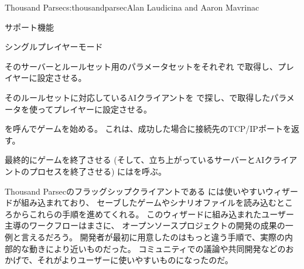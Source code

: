 \begin{aosachapter}{Thousand Parsec}{s:thousandparsec}{Alan Laudicina and Aaron Mavrinac}
\begin{aosasect1}{サポート機能}
\begin{aosasect2}{シングルプレイヤーモード}
\begin{aosaenumerate}
  \item そのサーバーとルールセット用のパラメータセットをそれぞれ
  で取得し、プレイヤーに設定させる。

  \item そのルールセットに対応しているAIクライアントを
  で探し、で取得したパラメータを使ってプレイヤーに設定させる。

  \item {}を呼んでゲームを始める。
  これは、成功した場合に接続先のTCP/IPポートを返す。

  \item 最終的にゲームを終了させる
  (そして、立ち上がっているサーバーとAIクライアントのプロセスを終了させる)
  にはを呼ぶ。

\end{aosaenumerate}

Thousand Parsecのフラッグシップクライアントである
には使いやすいウィザードが組み込まれており、
セーブしたゲームやシナリオファイルを読み込むところからこれらの手順を進めてくれる。
このウィザードに組み込まれたユーザー主導のワークフローはまさに、
オープンソースプロジェクトの開発の成果の一例と言えるだろう。
開発者が最初に用意したのはもっと違う手順で、実際の内部的な動きにより近いものだった。
コミュニティでの議論や共同開発などのおかげで、それがよりユーザーに使いやすいものになったのだ。


\end{aosasect2}
\end{aosasect1}
\end{aosachapter}
